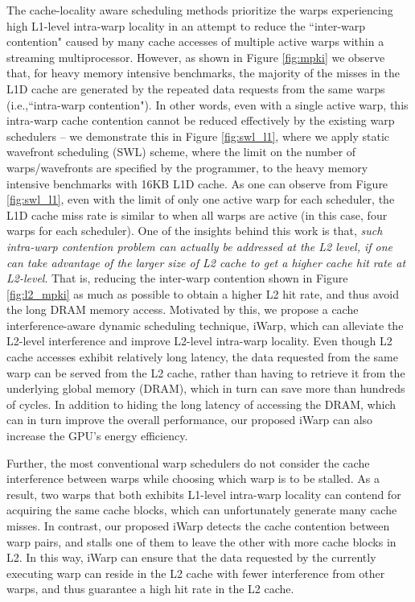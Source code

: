 \documentclass{sigplanconf}
\begin{document}
The cache-locality aware scheduling methods prioritize the warps experiencing high L1-level intra-warp locality in an attempt to reduce the ``inter-warp contention" caused by many cache accesses of multiple active warps within a streaming multiprocessor. However, as shown in Figure \ref{fig:mpki} we observe that, for heavy memory intensive benchmarks, the majority of the misses in the L1D cache are generated by the repeated data requests from the same warps (i.e.,``intra-warp contention"). In other words, even with a single active warp, this intra-warp cache contention cannot be reduced effectively by the existing warp schedulers -- we demonstrate this in Figure \ref{fig:swl_l1}, where we apply static wavefront scheduling (SWL) \cite{rogers2012cache} scheme, where the limit on the number of warps/wavefronts are specified by the programmer, to the heavy memory intensive benchmarks with 16KB L1D cache. As one can observe from Figure \ref{fig:swl_l1}, even with the limit of only one active warp for each scheduler, the L1D cache miss rate is similar to when all warps are active (in this case, four warps for each scheduler). One of the insights behind this work is that, \textit{such intra-warp contention problem can actually be addressed at the L2 level, if one can take advantage of the larger size of L2 cache to get a higher cache hit rate at L2-level}. That is, reducing the inter-warp contention shown in Figure \ref{fig:l2_mpki} as much as possible to obtain a higher L2 hit rate, and thus avoid the long DRAM memory access. Motivated by this, we propose a cache interference-aware dynamic scheduling technique, iWarp, which can alleviate the L2-level interference and improve L2-level intra-warp locality. Even though L2 cache accesses exhibit relatively long latency, the data requested from the same warp can be served from the L2 cache, rather than having to retrieve it from the underlying global memory (DRAM), which in turn can save more than hundreds of cycles. In addition to hiding the long latency of accessing the DRAM, which can in turn improve the overall performance, our proposed iWarp can also increase the GPU's energy efficiency.

Further, the most conventional warp schedulers do not consider the cache interference between warps while choosing which warp is to be stalled. As a result, two warps that both exhibits L1-level intra-warp locality can contend for acquiring the same cache blocks, which can unfortunately generate many cache misses. In contrast, our proposed iWarp detects the cache contention between warp pairs, and stalls one of them to leave the other with more cache blocks in L2. In this way, iWarp can ensure that the data requested by the currently executing warp can reside in the L2 cache with fewer interference from other warps, and thus guarantee a high hit rate in the L2 cache.
\end{document}
